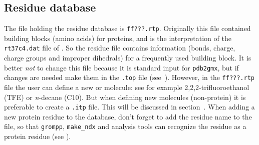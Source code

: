 \subsection{Residue database}
\label{subsec:rtp}
The file holding the residue database is {\tt ff???.rtp}. Originally
this file contained building blocks (amino acids) for proteins, and is
the {\gromacs} interpretation of the {\tt rt37c4.dat} file of {\gromos}. So
the residue file contains information (bonds, charge, charge groups
and improper dihedrals) for a frequently used building block. It is
better {\em not} to change this file because it is standard input for
{\tt pdb2gmx}, but if changes are needed make them in the
{\tt *.top} file (see~). 
However, in the {\tt ff???.rtp} file the user can define a new
 or molecule: see for example 2,2,2-trifluoroethanol
(TFE) or {\em n}-decane (C10). But when defining new molecules
(non-protein) it is preferable to create a {\tt *.itp}
file. This will be discussed in section~.
When adding a new protein residue to the database, don't forget to
add the residue name to the {\tt {}} file,
so that {\tt grompp}, {\tt make\_ndx} and analysis tools can recognize
the residue as a protein residue (see ).

